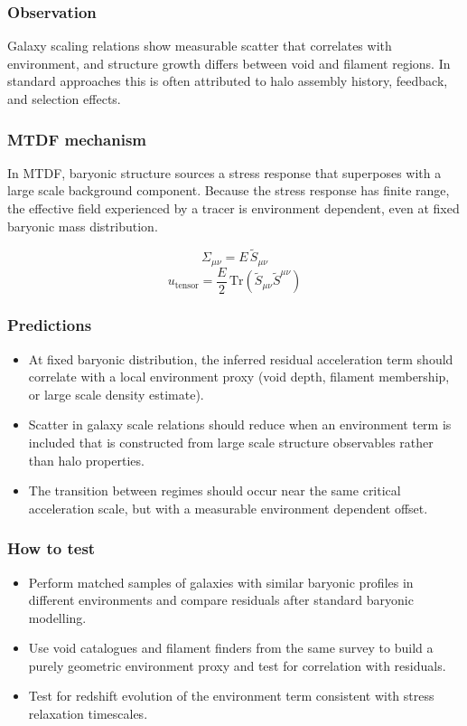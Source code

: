 \documentclass[11pt,a4paper]{article}
\begin{document}
\subsubsection{Observation}
Galaxy scaling relations show measurable scatter that correlates with environment, and structure growth differs between void and filament regions. In standard approaches this is often attributed to halo assembly history, feedback, and selection effects.

\subsubsection{MTDF mechanism}
In MTDF, baryonic structure sources a stress response that superposes with a large scale background component. Because the stress response has finite range, the effective field experienced by a tracer is environment dependent, even at fixed baryonic mass distribution.

$$
\Sigma_{\mu\nu} = E\,\tilde{S}_{\mu\nu}
$$
$$
u_{\mathrm{tensor}} = \frac{E}{2}\,\mathrm{Tr}\!\left(\tilde{S}_{\mu\nu}\tilde{S}^{\mu\nu}\right)
$$

\subsubsection{Predictions}
\begin{itemize}
  \item At fixed baryonic distribution, the inferred residual acceleration term should correlate with a local environment proxy (void depth, filament membership, or large scale density estimate).
  \item Scatter in galaxy scale relations should reduce when an environment term is included that is constructed from large scale structure observables rather than halo properties.
  \item The transition between regimes should occur near the same critical acceleration scale, but with a measurable environment dependent offset.
\end{itemize}

\subsubsection{How to test}
\begin{itemize}
  \item Perform matched samples of galaxies with similar baryonic profiles in different environments and compare residuals after standard baryonic modelling.
  \item Use void catalogues and filament finders from the same survey to build a purely geometric environment proxy and test for correlation with residuals.
  \item Test for redshift evolution of the environment term consistent with stress relaxation timescales.
\end{itemize}
\end{document}
